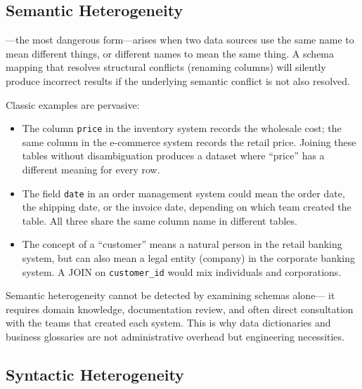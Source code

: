 \subsection{Semantic Heterogeneity}
\label{subsec:semantic-hetero}

---the most dangerous form---arises when
two data sources use the same name to mean different things, or
different names to mean the same thing. A schema mapping that resolves
structural conflicts (renaming columns) will silently produce incorrect
results if the underlying semantic conflict is not also resolved.

Classic examples are pervasive:
\begin{itemize}
  \item The column \texttt{price} in the inventory system records the
        wholesale cost; the same column in the e-commerce system
        records the retail price. Joining these tables without
        disambiguation produces a dataset where ``price'' has a
        different meaning for every row.
  \item The field \texttt{date} in an order management system could
        mean the order date, the shipping date, or the invoice date,
        depending on which team created the table. All three share
        the same column name in different tables.
  \item The concept of a ``customer'' means a natural person in the
        retail banking system, but can also mean a legal entity
        (company) in the corporate banking system. A JOIN on
        \texttt{customer\_id} would mix individuals and corporations.
\end{itemize}

Semantic heterogeneity cannot be detected by examining schemas alone---
it requires domain knowledge, documentation review, and often direct
consultation with the teams that created each system. This is why data
dictionaries and business glossaries are not administrative overhead but
engineering necessities.

\subsection{Syntactic Heterogeneity}
\label{subsec:syntactic-hetero}

